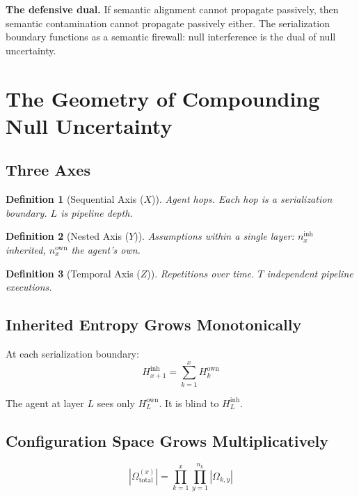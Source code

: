 \documentclass[11pt,a4paper]{article}
\newtheorem{definition}{Definition}
\begin{document}
\textbf{The defensive dual.} If semantic alignment cannot propagate 
passively, then semantic contamination cannot propagate passively 
either. The serialization boundary functions as a semantic firewall: 
null interference is the dual of null uncertainty.


\section{The Geometry of Compounding Null Uncertainty}
\label{sec:compounding}

\subsection{Three Axes}

\begin{definition}[Sequential Axis ($X$)]
Agent hops. Each hop is a serialization boundary. $L$ is pipeline depth.
\end{definition}

\begin{definition}[Nested Axis ($Y$)]
Assumptions within a single layer: $n_x^{\text{inh}}$ inherited, 
$n_x^{\text{own}}$ the agent's own.
\end{definition}

\begin{definition}[Temporal Axis ($Z$)]
Repetitions over time. $T$ independent pipeline executions.
\end{definition}

\subsection{Inherited Entropy Grows Monotonically}

At each serialization boundary:
\[
H_{x+1}^{\text{inh}} = \sum_{k=1}^{x} H_k^{\text{own}}
\]

The agent at layer $L$ sees only $H_L^{\text{own}}$. It is blind to 
$H_L^{\text{inh}}$.

\subsection{Configuration Space Grows Multiplicatively}

\[
|\Omega_{\text{total}}^{(x)}| = \prod_{k=1}^{x} \prod_{y=1}^{n_k} 
|\Omega_{k,y}|
\]
\end{document}
